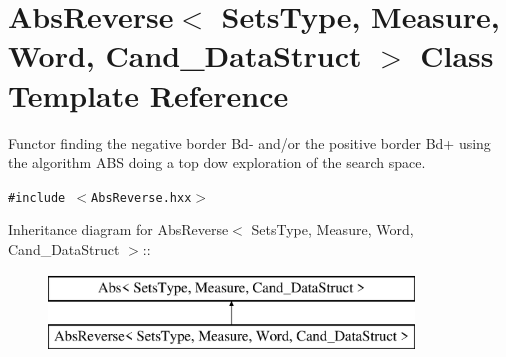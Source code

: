 \section{Abs\-Reverse$<$ Sets\-Type, Measure, Word, Cand\_\-Data\-Struct $>$ Class Template Reference}
\label{class_abs_reverse}
Functor finding the negative border Bd- and/or the positive border Bd+ using the algorithm ABS doing a top dow exploration of the search space.  


{\tt \#include $<$Abs\-Reverse.hxx$>$}

Inheritance diagram for Abs\-Reverse$<$ Sets\-Type, Measure, Word, Cand\_\-Data\-Struct $>$::\begin{figure}[H]
\begin{center}
\leavevmode
\includegraphics[height=2cm]{class_abs_reverse}
\end{center}
\end{figure}
